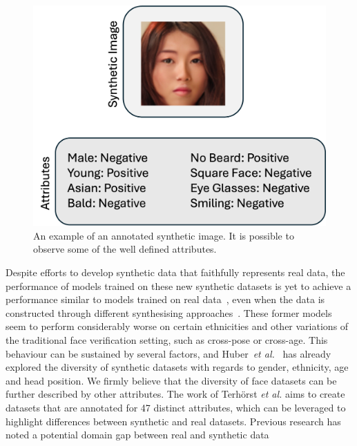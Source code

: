 \documentclass[a4paper, 10pt, conference]{ieeeconf}      %
\begin{document}
\begin{figure}
    \centering
    \includegraphics[width=0.96\linewidth]{image1_synthetic.png}
    \caption{An example of an annotated synthetic image. It is possible to observe some of the well defined attributes.  }
    \label{fig:distribution_illustration}
\end{figure}

Despite efforts to develop synthetic data that faithfully represents real data, the performance of models trained on these new synthetic datasets is yet to achieve a performance similar to models trained on real data~\cite{boutros2023idiff}, even when the data is constructed through different synthesising approaches~\cite{bae2023digiface}. These former models seem to perform considerably worse on certain ethnicities and other variations of the traditional face verification setting, such as cross-pose or cross-age. This behaviour can be sustained by several factors, and Huber~\textit{et al.}~\cite{huber2024bias} has already explored the diversity of synthetic datasets with regards to gender, ethnicity, age and head position. We firmly believe that the diversity of face datasets can be further described by other attributes. The work of Terhörst  \textit{et al.} \cite{terhorst2021maadface} aims to create datasets that are annotated for 47 distinct attributes, which can be leveraged to highlight differences between synthetic and real datasets. Previous research has noted a potential domain gap between real and synthetic data~\cite{DBLP:conf/aaai/XuZNLWTZ20,DBLP:conf/cvpr/Sankaranarayanan18,DBLP:conf/cvpr/LeePYL20}
\end{document}
